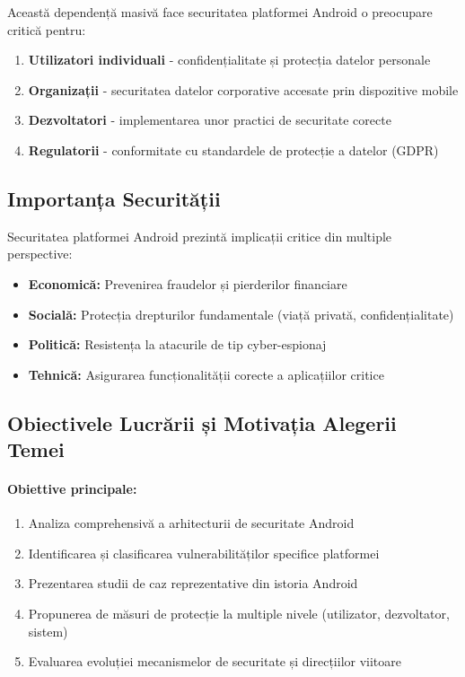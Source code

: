 \documentclass[11pt,a4paper,twocolumn]{article}
\theoremstyle{definition}
\theoremstyle{plain}
\theoremstyle{remark}
\begin{document}
Această dependență masivă face securitatea platformei Android o preocupare critică pentru:
\begin{enumerate}
    \item \textbf{Utilizatori individuali} - confidențialitate și protecția datelor personale
    \item \textbf{Organizații} - securitatea datelor corporative accesate prin dispozitive mobile
    \item \textbf{Dezvoltatori} - implementarea unor practici de securitate corecte
    \item \textbf{Regulatorii} - conformitate cu standardele de protecție a datelor (GDPR)
\end{enumerate}

\subsection{Importanța Securității}

Securitatea platformei Android prezintă implicații critice din multiple perspective:
\begin{itemize}
    \item \textbf{Economică:} Prevenirea fraudelor și pierderilor financiare
    \item \textbf{Socială:} Protecția drepturilor fundamentale (viață privată, confidențialitate)
    \item \textbf{Politică:} Resistența la atacurile de tip cyber-espionaj
    \item \textbf{Tehnică:} Asigurarea funcționalității corecte a aplicațiilor critice
\end{itemize}

\subsection{Obiectivele Lucrării și Motivația Alegerii Temei}

\paragraph{Obiettive principale:}
\begin{enumerate}
    \item Analiza comprehensivă a arhitecturii de securitate Android
    \item Identificarea și clasificarea vulnerabilităților specifice platformei
    \item Prezentarea studii de caz reprezentative din istoria Android
    \item Propunerea de măsuri de protecție la multiple nivele (utilizator, dezvoltator, sistem)
    \item Evaluarea evoluției mecanismelor de securitate și direcțiilor viitoare
\end{enumerate}
\end{document}
